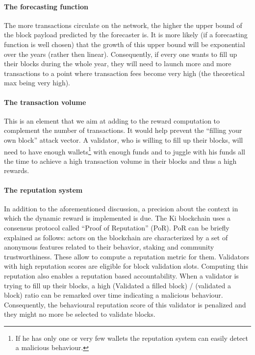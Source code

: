 \documentclass[conference]{IEEEtran}
\begin{document}
\paragraph{The forecasting function} The more transactions circulate on the network, the higher the upper bound of the block payload predicted by the forecaster is. It is more likely (if a forecasting function is well chosen) that the growth of this upper bound will be exponential over the years (rather then linear). Consequently, if every one wants to fill up their blocks during the whole year, they will need to launch more and more transactions to a point where transaction fees become very high (the theoretical max being very high).

\paragraph{The transaction volume} This is an element that we aim at adding to the reward computation to complement the number of transactions. It would help prevent the ``filling your own block'' attack vector. A validator, who is willing to fill up their blocks, will need to have enough wallets\footnote{If he has only one or very few wallets the reputation system can easily detect a malicious behaviour.} with enough funds and to juggle with his funds all the time to achieve a high transaction volume in their blocks and thus a high rewards.

\paragraph{The reputation system} In addition to the aforementioned discussion, a precision about the context in which the dynamic reward is implemented is due. The Ki blockchain uses a consensus protocol called ``Proof of Reputation'' (PoR). PoR can be briefly explained as follows: actors on the blockchain are characterized by a set of anonymous features related to their behavior, staking and community trustworthiness. These allow to compute a reputation metric for them. Validators with high reputation scores are eligible for block validation slots. Computing this reputation also enables a reputation based accountability. When a validator is trying to fill up their blocks, a high  (Validated a filled block) / (validated a block) ratio can be remarked over time indicating a malicious behaviour. Consequently, the behavioural reputation score of this validator is penalized and they might no more be selected to validate blocks.
\end{document}
